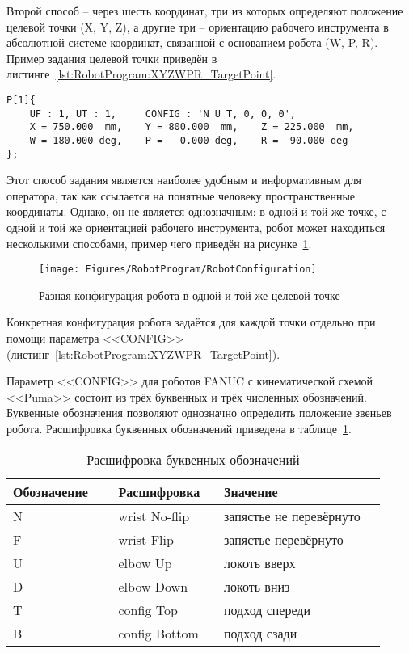 Второй способ -- через шесть координат, три из которых определяют положение целевой точки (X, Y, Z), а другие три -- ориентацию рабочего инструмента в абсолютной системе координат, связанной с основанием робота (W, P, R).
Пример задания целевой точки приведён в листинге~\ref{lst:RobotProgram:XYZWPR_TargetPoint}.

\begin{lstlisting}[caption={Задание целевой точки с помощью координат XYZWPR}, label={lst:RobotProgram:XYZWPR_TargetPoint}]
P[1]{
    UF : 1, UT : 1,     CONFIG : 'N U T, 0, 0, 0',
    X = 750.000  mm,    Y = 800.000  mm,    Z = 225.000  mm,
    W = 180.000 deg,    P =   0.000 deg,    R =  90.000 deg
};
\end{lstlisting}

Этот способ задания является наиболее удобным и информативным для оператора, так как ссылается на понятные человеку пространственные координаты.
Однако, он не является однозначным: в одной и той же точке, с одной и той же ориентацией рабочего инструмента, робот может находиться несколькими способами, пример чего приведён на рисунке~\ref{fig:RobotProgram:RobotConfiguration}.

\begin{figure}[H]
    \centering
    \vspace{14pt}
    \texttt{[image: Figures/RobotProgram/RobotConfiguration]}
    \caption{Разная конфигурация робота в одной и той же целевой точке}
    \label{fig:RobotProgram:RobotConfiguration}
\end{figure}

Конкретная конфигурация робота задаётся для каждой точки отдельно при помощи параметра <<CONFIG>> (листинг~\ref{lst:RobotProgram:XYZWPR_TargetPoint}).

Параметр <<CONFIG>> для роботов FANUC с кинематической схемой <<Puma>> состоит из трёх буквенных и трёх численных обозначений.
Буквенные обозначения позволяют однозначно определить положение звеньев робота.
Расшифровка буквенных обозначений приведена в таблице~\ref{tab:RobotProgram:RobotConfig}.

\begin{table}[H]
    \caption{Расшифровка буквенных обозначений}
    \label{tab:RobotProgram:RobotConfig}
    \begin{tabular}{|p{0.26\linewidth}|p{0.26\linewidth}|p{0.4\linewidth}|}
        \hline
        Обозначение & Расшифровка   & Значение                \\ \hline
        N           & wrist No-flip & запястье не перевёрнуто \\ \hline
        F           & wrist Flip    & запястье перевёрнуто    \\ \hline
        U           & elbow Up      & локоть вверх            \\ \hline
        D           & elbow Down    & локоть вниз             \\ \hline
        T           & config Top    & подход спереди          \\ \hline
        B           & config Bottom & подход сзади            \\ \hline
    \end{tabular}
\end{table}

